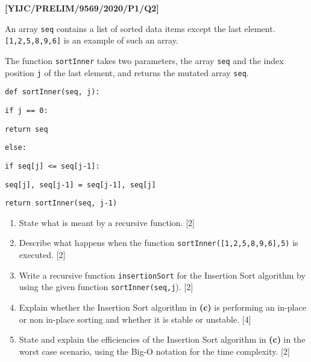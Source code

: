 \item \textbf{{[}YIJC/PRELIM/9569/2020/P1/Q2{]} }

An array \texttt{seq} contains a list of sorted data items except
the last element. \texttt{{[}1,2,5,8,9,6{]}} is an example of such
an array. 

The function \texttt{sortInner} takes two parameters, the array \texttt{seq}
and the index position \texttt{j} of the last element, and returns
the mutated array \texttt{seq}. 

\noindent\begin{minipage}[t]{1\columnwidth}%
\texttt{def sortInner(seq, j): }

\texttt{\qquad{}if j == 0: }

\texttt{\qquad{}\qquad{}return seq }

\texttt{\qquad{}else: }

\texttt{\qquad{}\qquad{}if seq{[}j{]} <= seq{[}j-1{]}: }

\texttt{\qquad{}\qquad{}\qquad{}seq{[}j{]}, seq{[}j-1{]} = seq{[}j-1{]},
seq{[}j{]} }

\texttt{\qquad{}return sortInner(seq, j-1)}%
\end{minipage} 
\begin{enumerate}
\item State what is meant by a recursive function.\hfill{} {[}2{]} 
\item Describe what happens when the function \texttt{sortInner({[}1,2,5,8,9,6{]},5)}
is executed. \hfill{}{[}2{]} 
\item Write a recursive function \texttt{insertionSort} for the Insertion
Sort algorithm by using the given function \texttt{sortInner(seq,j}).\hfill{}
{[}2{]} 
\item Explain whether the Insertion Sort algorithm in \textbf{(c)} is performing
an \textquotedbl in-place\textquotedbl{} or \textquotedbl non in-place\textquotedbl{}
sorting and whether it is stable or unstable.\hfill{} {[}4{]} 
\item State and explain the efficiencies of the Insertion Sort algorithm
in \textbf{(c)} in the worst case scenario, using the Big-O notation
for the time complexity. \hfill{}{[}2{]} 
\end{enumerate}